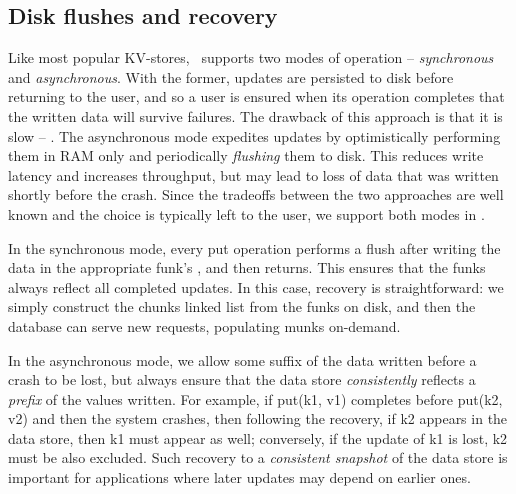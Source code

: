 \subsection{Disk flushes and recovery}
\label{ssec:flush-recovery}

Like most popular KV-stores, \sys\ supports two modes of operation -- \emph{synchronous} and \emph{asynchronous}. 
With the former,  updates are persisted to disk before returning to the user, and so a user is ensured when its operation
completes that the written data will survive failures. The drawback of this approach is that it is slow -- . 
The asynchronous mode expedites updates by optimistically performing them in
RAM only and periodically \emph{flushing} them to disk. This reduces write latency and increases throughput, but 
may lead to loss of data that was written shortly before the crash. Since the tradeoffs between the two approaches are 
well known and the choice is typically left to the user, we support both modes in \sys.

In the synchronous mode, every put operation performs a flush after writing the data in the appropriate funk's , and then returns. 
This ensures that the funks always reflect all completed updates. In this case, recovery is straightforward: we simply construct
the chunks linked list from the funks on disk, and then the database can serve new requests, populating munks on-demand.  

In the asynchronous mode, we allow some suffix of the  data written before a crash to be lost, but always 
ensure that the data store \emph{consistently} reflects a \emph{prefix} of the  values written.
For example, if put(k1, v1) completes before put(k2, v2) and then the system crashes, then following the recovery, 
if k2 appears in the data store, then k1 must appear as well; conversely, if the update of k1 is lost, k2 must be also excluded.
Such recovery to a \emph{consistent snapshot} of the data store is important for applications where later updates may depend on earlier ones. 










